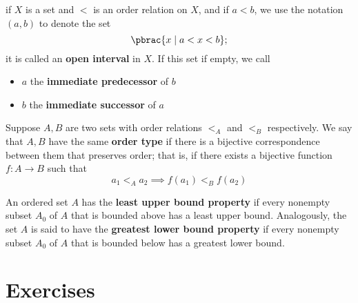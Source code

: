 \begin{definition}
  if $X$ is a set and $<$ is an order relation on $X$, and if $a<b$, we use the notation $(a, b)$ to denote the set
  \begin{equation}
    \pbrac{
      x \mid a < x < b
    };
  \end{equation}
  it is called an \textbf{open interval} in $X$. If this set if empty, we call
  \begin{itemize}
    \item $a$ the \textbf{immediate predecessor} of $b$
    \item $b$ the \textbf{immediate successor} of $a$
  \end{itemize}
\end{definition}

\begin{definition}
  Suppose $A, B$ are two sets with order relations $<_A$ and $<_B$ respectively. We say that $A, B$ have the same \textbf{order type} if there is a bijective correspondence between them that preserves order; that is, if there exists a bijective function $f : A \to B$ such that
  \begin{equation}
    a_1 <_A a_2 \implies f(a_1) <_B f(a_2)
  \end{equation}
\end{definition}

\begin{definition}
  An ordered set $A$ has the \textbf{least upper bound property} if every
  nonempty subset $A_0$ of $A$ that is bounded above has a least upper bound.
  Analogously, the set $A$ is said to have the \textbf{greatest lower bound
  property} if every nonempty subset $A_0$ of $A$ that is bounded below has a
  greatest lower bound.
\end{definition}

\section*{Exercises}

